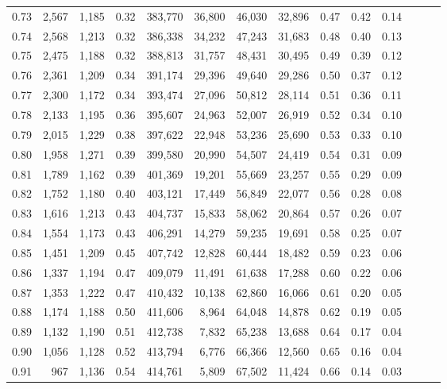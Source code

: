 \begin{tabular}{rrrrrrrrrrrrrr}
0.73 &  2,567 &  1,185 &  0.32 &  383,770 &   36,800 &  46,030 &  32,896 &  0.47 &  0.42 &      0.14 \\
0.74 &  2,568 &  1,213 &  0.32 &  386,338 &   34,232 &  47,243 &  31,683 &  0.48 &  0.40 &      0.13 \\
0.75 &  2,475 &  1,188 &  0.32 &  388,813 &   31,757 &  48,431 &  30,495 &  0.49 &  0.39 &      0.12 \\
0.76 &  2,361 &  1,209 &  0.34 &  391,174 &   29,396 &  49,640 &  29,286 &  0.50 &  0.37 &      0.12 \\
0.77 &  2,300 &  1,172 &  0.34 &  393,474 &   27,096 &  50,812 &  28,114 &  0.51 &  0.36 &      0.11 \\
0.78 &  2,133 &  1,195 &  0.36 &  395,607 &   24,963 &  52,007 &  26,919 &  0.52 &  0.34 &      0.10 \\
0.79 &  2,015 &  1,229 &  0.38 &  397,622 &   22,948 &  53,236 &  25,690 &  0.53 &  0.33 &      0.10 \\
0.80 &  1,958 &  1,271 &  0.39 &  399,580 &   20,990 &  54,507 &  24,419 &  0.54 &  0.31 &      0.09 \\
0.81 &  1,789 &  1,162 &  0.39 &  401,369 &   19,201 &  55,669 &  23,257 &  0.55 &  0.29 &      0.09 \\
0.82 &  1,752 &  1,180 &  0.40 &  403,121 &   17,449 &  56,849 &  22,077 &  0.56 &  0.28 &      0.08 \\
0.83 &  1,616 &  1,213 &  0.43 &  404,737 &   15,833 &  58,062 &  20,864 &  0.57 &  0.26 &      0.07 \\
0.84 &  1,554 &  1,173 &  0.43 &  406,291 &   14,279 &  59,235 &  19,691 &  0.58 &  0.25 &      0.07 \\
0.85 &  1,451 &  1,209 &  0.45 &  407,742 &   12,828 &  60,444 &  18,482 &  0.59 &  0.23 &      0.06 \\
0.86 &  1,337 &  1,194 &  0.47 &  409,079 &   11,491 &  61,638 &  17,288 &  0.60 &  0.22 &      0.06 \\
0.87 &  1,353 &  1,222 &  0.47 &  410,432 &   10,138 &  62,860 &  16,066 &  0.61 &  0.20 &      0.05 \\
0.88 &  1,174 &  1,188 &  0.50 &  411,606 &    8,964 &  64,048 &  14,878 &  0.62 &  0.19 &      0.05 \\
0.89 &  1,132 &  1,190 &  0.51 &  412,738 &    7,832 &  65,238 &  13,688 &  0.64 &  0.17 &      0.04 \\
0.90 &  1,056 &  1,128 &  0.52 &  413,794 &    6,776 &  66,366 &  12,560 &  0.65 &  0.16 &      0.04 \\
0.91 &    967 &  1,136 &  0.54 &  414,761 &    5,809 &  67,502 &  11,424 &  0.66 &  0.14 &      0.03 \\

\end{tabular}
